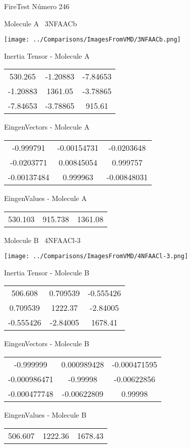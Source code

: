 \vtab[-3cm]
\begin{center}
{\large FireTest \tab Número 246}
\end{center}
\begin{multicols}{2}
\begin{center}

Molecule A \
3NFAACb

\texttt{[image: ../Comparisons/ImagesFromVMD/3NFAACb.png]}

Inertia Tensor - Molecule A \\
\begin{tabular}{|c c c|}
530.265	 & 	-1.20883	 & 	-7.84653	 \\
-1.20883	 & 	1361.05	 & 	-3.78865	 \\
-7.84653	 & 	-3.78865	 & 	915.61
\end{tabular}

\vtab
 EingenVectors - Molecule A     \\
\begin{tabular}{|c c c|}
-0.999791	 & 	-0.00154731	 & 	-0.0203648	 \\
-0.0203771	 & 	0.00845054	 & 	0.999757	 \\
-0.00137484	 & 	0.999963	 & 	-0.00848031
\end{tabular}

\vtab
 EingenValues - Molecule A     \\
\begin{tabular}{|c c c|}
530.103	 & 	915.738	 & 	1361.08	 \\
\end{tabular}
\columnbreak

Molecule B \
4NFAACl-3

\texttt{[image: ../Comparisons/ImagesFromVMD/4NFAACl-3.png]}

Inertia Tensor - Molecule B \\
\begin{tabular}{|c c c|}
506.608	 & 	0.709539	 & 	-0.555426	 \\
0.709539	 & 	1222.37	 & 	-2.84005	 \\
-0.555426	 & 	-2.84005	 & 	1678.41
\end{tabular}

\vtab
 EingenVectors - Molecule B     \\
\begin{tabular}{|c c c|}
-0.999999	 & 	0.000989428	 & 	-0.000471595	 \\
-0.000986471	 & 	-0.99998	 & 	-0.00622856	 \\
-0.000477748	 & 	-0.00622809	 & 	0.99998
\end{tabular}

\vtab
 EingenValues - Molecule B     \\
\begin{tabular}{|c c c|}
506.607	 & 	1222.36	 & 	1678.43	 \\
\end{tabular}

\end{center}
\end{multicols}

